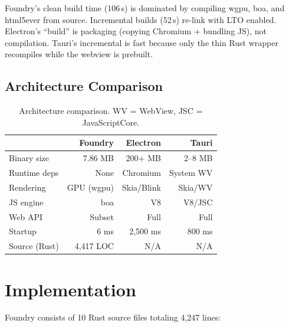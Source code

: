 \documentclass[11pt,twocolumn]{article}
\begin{document}
Foundry's clean build time (106\,s) is dominated by compiling wgpu, boa, and html5ever from source. Incremental builds (52\,s) re-link with LTO enabled. Electron's ``build'' is packaging (copying Chromium + bundling JS), not compilation. Tauri's incremental is fast because only the thin Rust wrapper recompiles while the webview is prebuilt.

\subsection{Architecture Comparison}

\begin{table}[h]
\centering
\begin{tabular}{lrrr}
\toprule
& \textbf{Foundry} & \textbf{Electron} & \textbf{Tauri} \\
\midrule
Binary size & 7.86 MB & 200+ MB & 2--8 MB \\
Runtime deps & None & Chromium & System WV \\
Rendering & GPU (wgpu) & Skia/Blink & Skia/WV \\
JS engine & boa & V8 & V8/JSC \\
Web API & Subset & Full & Full \\
Startup & 6 ms & 2,500 ms & 800 ms \\
Source (Rust) & 4,417 LOC & N/A & N/A \\
\bottomrule
\end{tabular}
\caption{Architecture comparison. WV = WebView, JSC = JavaScriptCore.}
\label{tab:arch}
\end{table}

\section{Implementation}

Foundry consists of 10 Rust source files totaling 4,247 lines:
\end{document}
